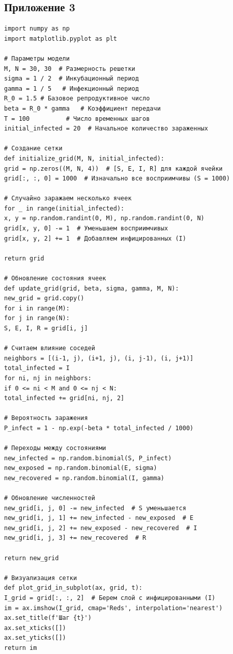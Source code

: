 \documentclass[a4paper, 14pt]{extreport}
\begin{document}
\subsection*{Приложение 3}
\begin{verbatim}
import numpy as np
import matplotlib.pyplot as plt

# Параметры модели
M, N = 30, 30  # Размерность решетки
sigma = 1 / 2  # Инкубационный период
gamma = 1 / 5   # Инфекционный период
R_0 = 1.5 # Базовое репродуктивное число 
beta = R_0 * gamma   # Коэффициент передачи
T = 100          # Число временных шагов
initial_infected = 20  # Начальное количество зараженных

# Создание сетки
def initialize_grid(M, N, initial_infected):
grid = np.zeros((M, N, 4))  # [S, E, I, R] для каждой ячейки
grid[:, :, 0] = 1000  # Изначально все восприимчивы (S = 1000)

# Случайно заражаем несколько ячеек
for _ in range(initial_infected):
x, y = np.random.randint(0, M), np.random.randint(0, N)
grid[x, y, 0] -= 1  # Уменьшаем восприимчивых
grid[x, y, 2] += 1  # Добавляем инфицированных (I)

return grid

# Обновление состояния ячеек
def update_grid(grid, beta, sigma, gamma, M, N):
new_grid = grid.copy()
for i in range(M):
for j in range(N):
S, E, I, R = grid[i, j]

# Считаем влияние соседей
neighbors = [(i-1, j), (i+1, j), (i, j-1), (i, j+1)]
total_infected = I
for ni, nj in neighbors:
if 0 <= ni < M and 0 <= nj < N:
total_infected += grid[ni, nj, 2]

# Вероятность заражения
P_infect = 1 - np.exp(-beta * total_infected / 1000)

# Переходы между состояниями
new_infected = np.random.binomial(S, P_infect)
new_exposed = np.random.binomial(E, sigma)
new_recovered = np.random.binomial(I, gamma)

# Обновление численностей
new_grid[i, j, 0] -= new_infected  # S уменьшается
new_grid[i, j, 1] += new_infected - new_exposed  # E
new_grid[i, j, 2] += new_exposed - new_recovered  # I
new_grid[i, j, 3] += new_recovered  # R

return new_grid

# Визуализация сетки
def plot_grid_in_subplot(ax, grid, t):
I_grid = grid[:, :, 2]  # Берем слой с инфицированными (I)
im = ax.imshow(I_grid, cmap='Reds', interpolation='nearest')
ax.set_title(f'Шаг {t}')
ax.set_xticks([])
ax.set_yticks([])
return im


\end{verbatim}
\end{document}
